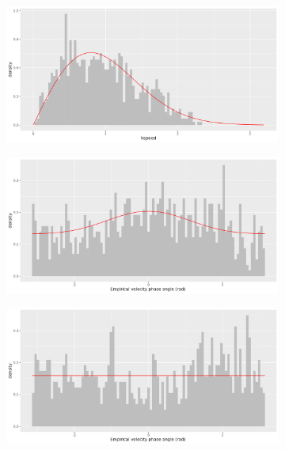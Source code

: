 \documentclass[11pt]{article}
\newcommand {\1}{\mathbb{1}}
\begin{document}
\begin{figure}[H]
\begin{subfigure}{0.48\textwidth}
		\caption{}
	\end{subfigure}
\begin{subfigure}{0.48\textwidth}
	\centering
	\includegraphics[scale=0.3]{images/rcvm/hspeed_histo_tau5_nu1omega0_mu10_sigmaobs0.03 .png}
	\caption{}
\end{subfigure}
\begin{subfigure}{0.48\textwidth}
	\centering
	\includegraphics[scale=0.3]{images/rcvm/theta_histo_tau5_nu5omega1_mu11_sigmaobs0.03 .png}
	\caption{}
\end{subfigure}
\begin{subfigure}{0.48\textwidth}
	\centering
	\includegraphics[scale=0.3]{images/rcvm/theta_histo_tau5_nu1omega0_mu10_sigmaobs0.03 .png}

\end{subfigure}
\end{figure}
\end{document}
